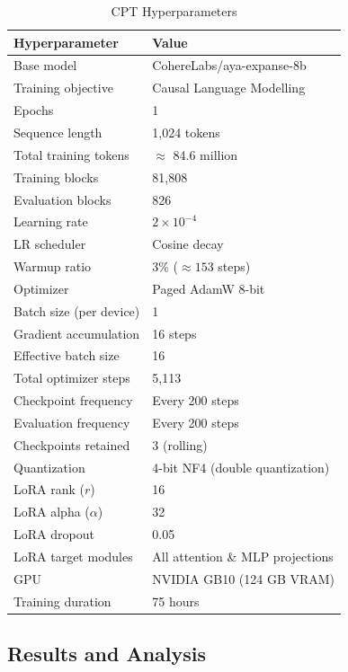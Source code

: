 \documentclass[12pt,a4paper]{report}
\begin{document}
\begin{table}[h]
\centering
\caption{CPT Hyperparameters}
\label{tab:cpt_hparams}
\begin{tabular}{ll}
\toprule
\textbf{Hyperparameter} & \textbf{Value} \\
\midrule
Base model              & CohereLabs/aya-expanse-8b \\
Training objective      & Causal Language Modelling \\
Epochs                  & 1 \\
Sequence length         & 1,024 tokens \\
Total training tokens   & $\approx$ 84.6 million \\
Training blocks         & 81,808 \\
Evaluation blocks       & 826 \\
Learning rate           & $2 \times 10^{-4}$ \\
LR scheduler            & Cosine decay \\
Warmup ratio            & 3\% ($\approx 153$ steps) \\
Optimizer               & Paged AdamW 8-bit \\
Batch size (per device) & 1 \\
Gradient accumulation   & 16 steps \\
Effective batch size    & 16 \\
Total optimizer steps   & 5,113 \\
Checkpoint frequency    & Every 200 steps \\
Evaluation frequency    & Every 200 steps \\
Checkpoints retained    & 3 (rolling) \\
Quantization            & 4-bit NF4 (double quantization) \\
LoRA rank ($r$)         & 16 \\
LoRA alpha ($\alpha$)   & 32 \\
LoRA dropout            & 0.05 \\
LoRA target modules     & All attention \& MLP projections \\
GPU                     & NVIDIA GB10 (124 GB VRAM) \\
Training duration       & 75 hours \\
\bottomrule
\end{tabular}
\end{table}

\subsection{Results and Analysis}
\end{document}
